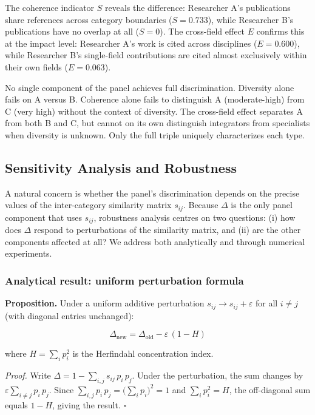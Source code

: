 \documentclass[
]{article}
\begin{document}
The coherence indicator \(S\) reveals the difference: Researcher A's
publications share references across category boundaries
(\(S = 0.733\)), while Researcher B's publications have no overlap at
all (\(S = 0\)). The cross-field effect \(E\) confirms this at the
impact level: Researcher A's work is cited across disciplines
(\(E = 0.600\)), while Researcher B's single-field contributions are
cited almost exclusively within their own fields (\(E = 0.063\)).

No single component of the panel achieves full discrimination. Diversity
alone fails on A versus B. Coherence alone fails to distinguish A
(moderate-high) from C (very high) without the context of diversity. The
cross-field effect separates A from both B and C, but cannot on its own
distinguish integrators from specialists when diversity is unknown. Only
the full triple uniquely characterizes each type.

\hypertarget{sensitivity-analysis-and-robustness}{%
\subsection{Sensitivity Analysis and
Robustness}\label{sensitivity-analysis-and-robustness}}

A natural concern is whether the panel's discrimination depends on the
precise values of the inter-category similarity matrix \(s_{ij}\).
Because \(\Delta\) is the only panel component that uses \(s_{ij}\),
robustness analysis centres on two questions: (i) how does \(\Delta\)
respond to perturbations of the similarity matrix, and (ii) are the
other components affected at all? We address both analytically and
through numerical experiments.

\hypertarget{analytical-result-uniform-perturbation-formula}{%
\subsubsection{Analytical result: uniform perturbation
formula}\label{analytical-result-uniform-perturbation-formula}}

\textbf{Proposition.} Under a uniform additive perturbation
\(s_{ij} \to s_{ij} + \varepsilon\) for all \(i \neq j\) (with diagonal
entries unchanged):

\[\Delta_{\text{new}} = \Delta_{\text{old}} - \varepsilon\,(1 - H)\]

where \(H = \sum_i p_i^2\) is the Herfindahl concentration index.

\emph{Proof.} Write \(\Delta = 1 - \sum_{i,j} s_{ij}\,p_i\,p_j\). Under
the perturbation, the sum changes by
\(\varepsilon \sum_{i \neq j} p_i\,p_j\). Since
\(\sum_{i,j} p_i\,p_j = \bigl(\sum_i p_i\bigr)^2 = 1\) and
\(\sum_i p_i^2 = H\), the off-diagonal sum equals \(1 - H\), giving the
result. \(\square\)
\end{document}
